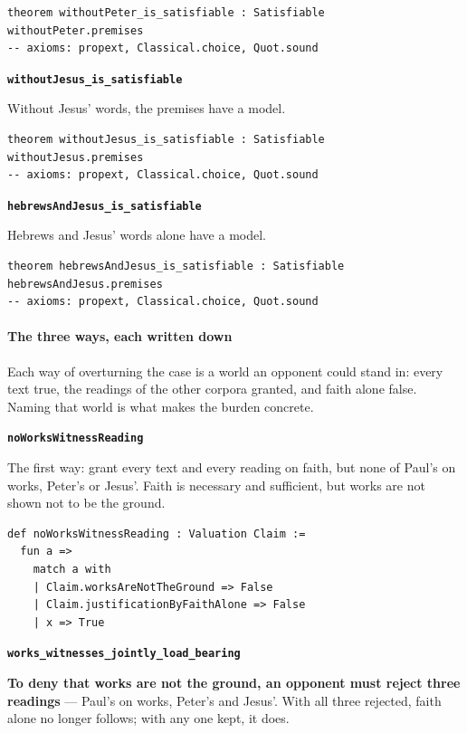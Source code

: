 \documentclass[11pt]{article}
\begin{document}
{\small\begin{verbatim}
theorem withoutPeter_is_satisfiable : Satisfiable withoutPeter.premises
-- axioms: propext, Classical.choice, Quot.sound
\end{verbatim}}
\par\medskip\noindent\textbf{\texttt{without\allowbreak{}Jesus\_\allowbreak{}is\_\allowbreak{}satisfiable}}\par\nobreak\noindent
Without Jesus' words, the premises have a model.

{\small\begin{verbatim}
theorem withoutJesus_is_satisfiable : Satisfiable withoutJesus.premises
-- axioms: propext, Classical.choice, Quot.sound
\end{verbatim}}
\par\medskip\noindent\textbf{\texttt{hebrews\allowbreak{}And\allowbreak{}Jesus\_\allowbreak{}is\_\allowbreak{}satisfiable}}\par\nobreak\noindent
Hebrews and Jesus' words alone have a model.

{\small\begin{verbatim}
theorem hebrewsAndJesus_is_satisfiable : Satisfiable hebrewsAndJesus.premises
-- axioms: propext, Classical.choice, Quot.sound
\end{verbatim}}
\paragraph*{The three ways, each written down}
\leavevmode\par
Each way of overturning the case is a world an opponent could stand in: every text true, the readings of the other corpora granted, and faith alone false. Naming that world is what makes the burden concrete.

\par\medskip\noindent\textbf{\texttt{no\allowbreak{}Works\allowbreak{}Witness\allowbreak{}Reading}}\par\nobreak\noindent
The first way: grant every text and every reading on faith, but none of Paul's on works, Peter's or Jesus'. Faith is necessary and sufficient, but works are not shown not to be the ground.

{\small\begin{verbatim}
def noWorksWitnessReading : Valuation Claim :=
  fun a =>
    match a with
    | Claim.worksAreNotTheGround => False
    | Claim.justificationByFaithAlone => False
    | x => True
\end{verbatim}}
\par\medskip\noindent\textbf{\texttt{works\_\allowbreak{}witnesses\_\allowbreak{}jointly\_\allowbreak{}load\_\allowbreak{}bearing}}\par\nobreak\noindent
\textbf{To deny that works are not the ground, an opponent must reject three readings} — Paul's on works, Peter's and Jesus'. With all three rejected, faith alone no longer follows; with any one kept, it does.
\end{document}
